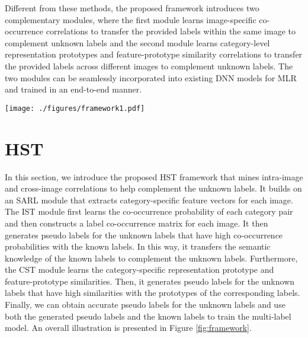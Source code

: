Different from these methods, the proposed framework introduces two complementary modules, where the first module learns image-specific co-occurrence correlations to transfer the provided labels within the same image to complement unknown labels and the second module learns category-level representation prototypes and feature-prototype similarity correlations to transfer the provided labels across different images to complement unknown labels. The two modules can be seamlessly incorporated into existing DNN models for MLR and trained in an end-to-end manner.

\begin{figure*}[!t]
   \centering
   \texttt{[image: ./figures/framework1.pdf]}
   \caption{An overall illustration of the proposed HST framework. The upper part is the overall pipeline that consists of the IST and CST modules for generating pseudo labels, which are then fed to the supervised training process of the MLR model. The lower part contains the detailed implementations of the IST and CST modules. The IST module first predicts label co-occurrence matrices and then maps the known labels to complement the unknown labels. The CST module first learns category-specific feature and prototype similarities across different images and then maps them to generate pseudo labels.}
   \label{fig:framework}
\end{figure*}

\section{HST}
\label{sec:HST}
In this section, we introduce the proposed HST framework that mines intra-image and cross-image correlations to help complement the unknown labels. It builds on an SARL module that extracts category-specific feature vectors for each image. The IST module first learns the co-occurrence probability of each category pair and then constructs a label co-occurrence matrix for each image. It then generates pseudo labels for the unknown labels that have high co-occurrence probabilities with the known labels. In this way, it transfers the semantic knowledge of the known labels to complement the unknown labels. Furthermore, the CST module learns the category-specific representation prototype and feature-prototype similarities. Then, it generates pseudo labels for the unknown labels that have high similarities with the prototypes of the corresponding labels. Finally, we can obtain accurate pseudo labels for the unknown labels and use both the generated pseudo labels and the known labels to train the multi-label model. An overall illustration is presented in Figure \ref{fig:framework}.

